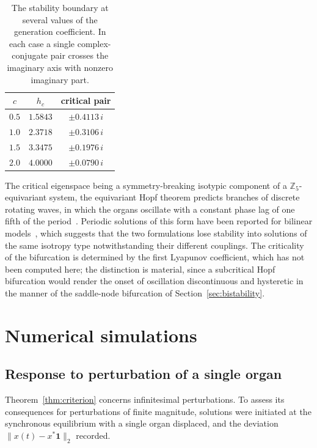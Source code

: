 \documentclass[11pt]{article}
\newcommand{\Z}{{\mathbb{Z}}}
\theoremstyle{definition}
\theoremstyle{remark}
\begin{document}
	\begin{table}[!htb]
		\centering
		\begin{tabular}{ccc}
			\toprule
			$c$ & $h_{c}$ & critical pair \\
			\midrule
			$0.5$ & $1.5843$ & $\pm0.4113\,i$ \\
			$1.0$ & $2.3718$ & $\pm0.3106\,i$ \\
			$1.5$ & $3.3475$ & $\pm0.1976\,i$ \\
			$2.0$ & $4.0000$ & $\pm0.0790\,i$ \\
			\bottomrule
		\end{tabular}
		\caption{The stability boundary at several values of the generation coefficient. In
			each case a single complex-conjugate pair crosses the imaginary axis with nonzero
			imaginary part.}
		\label{tab:hopf}
	\end{table}
	
	The critical eigenspace being a symmetry-breaking isotypic component of a
	$\Z_5$-equivariant system, the equivariant Hopf theorem predicts branches of
	discrete rotating waves, in which the organs oscillate with a constant phase lag of
	one fifth of the period~\cite{GolubitskyStewartSchaeffer1988,GolubitskyStewart2002}.
	Periodic solutions of this form have been reported for bilinear
	models~\cite{Lin2020}, which suggests that the two formulations lose stability into
	solutions of the same isotropy type notwithstanding their different couplings. The
	criticality of the bifurcation is determined by the first Lyapunov coefficient,
	which has not been computed here; the distinction is material, since a subcritical
	Hopf bifurcation would render the onset of oscillation discontinuous and hysteretic
	in the manner of the saddle-node bifurcation of Section~\ref{sec:bistability}.
	
	\section{Numerical simulations}\label{sec:numerics}
	
	\subsection{Response to perturbation of a single organ}
	
	Theorem~\ref{thm:criterion} concerns infinitesimal perturbations. To assess its
	consequences for perturbations of finite magnitude, solutions were initiated at the
	synchronous equilibrium with a single organ displaced, and the deviation
	$\|x(t)-x^\ast\mathbf 1\|_2$ recorded.
	
\end{document}
